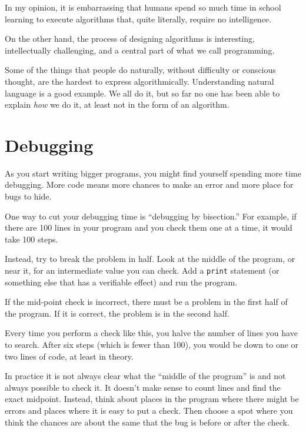 \documentclass[10pt]{book}
\begin{document}
In my opinion, it is embarrassing that humans spend so much time in
school learning to execute algorithms that, quite literally, require
no intelligence.

On the other hand, the process of designing algorithms is interesting,
intellectually challenging, and a central part of what we call
programming.

Some of the things that people do naturally, without difficulty or
conscious thought, are the hardest to express algorithmically.
Understanding natural language is a good example.  We all do it, but
so far no one has been able to explain {\em how} we do it, at least
not in the form of an algorithm.


\section{Debugging}

As you start writing bigger programs, you might find yourself
spending more time debugging.  More code means more chances to
make an error and more place for bugs to hide.


One way to cut your debugging time is ``debugging by bisection.''
For example, if there are 100 lines in your program and you
check them one at a time, it would take 100 steps.

Instead, try to break the problem in half.  Look at the middle
of the program, or near it, for an intermediate value you
can check.  Add a {\tt print} statement (or something else
that has a verifiable effect) and run the program.

If the mid-point check is incorrect, there must be a problem in the
first half of the program.  If it is correct, the problem is
in the second half.

Every time you perform a check like this, you halve the number of
lines you have to search.  After six steps (which is fewer than 100),
you would be down to one or two lines of code, at least in theory.

In practice it is not always clear what
the ``middle of the program'' is and not always possible to
check it.  It doesn't make sense to count lines and find the
exact midpoint.  Instead, think about places
in the program where there might be errors and places where it
is easy to put a check.  Then choose a spot where you
think the chances are about the same that the bug is before
or after the check.
\end{document}
